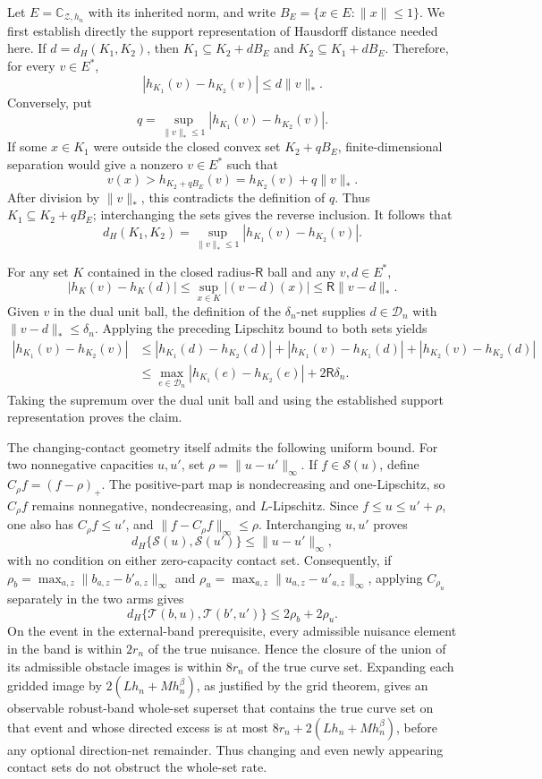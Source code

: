 Let \(E=\mathbb C_{\mathcal Z,h_n}\) with its inherited norm, and write
\(B_E=\{x\in E:\|x\|\le1\}\).  We first establish directly the support
representation of Hausdorff distance needed here.  If
\(d=d_H(K_1,K_2)\), then
\(K_1\subseteq K_2+dB_E\) and \(K_2\subseteq K_1+dB_E\).  Therefore, for
every \(v\in E^*\),
\[
 |h_{K_1}(v)-h_{K_2}(v)|\le d\|v\|_*.
\]
Conversely, put
\[
 q=\sup_{\|v\|_*\le1}|h_{K_1}(v)-h_{K_2}(v)|.
\]
If some \(x\in K_1\) were outside the closed convex set \(K_2+qB_E\),
finite-dimensional separation would give a nonzero \(v\in E^*\) such that
\[
 v(x)>h_{K_2+qB_E}(v)=h_{K_2}(v)+q\|v\|_*.
\]
After division by \(\|v\|_*\), this contradicts the definition of \(q\).
Thus \(K_1\subseteq K_2+qB_E\); interchanging the sets gives the reverse
inclusion.  It follows that
\[
 d_H(K_1,K_2)=
 \sup_{\|v\|_*\le1}|h_{K_1}(v)-h_{K_2}(v)|.
\]

For any set \(K\) contained in the closed radius-\(\mathsf R\) ball and any
\(v,d\in E^*\),
\[
 |h_K(v)-h_K(d)|
 \le\sup_{x\in K}|(v-d)(x)|
 \le\mathsf R\|v-d\|_*.
\]
Given \(v\) in the dual unit ball, the definition of the
\(\delta_n\)-net supplies \(d\in\mathcal D_n\) with
\(\|v-d\|_*\le\delta_n\).  Applying the preceding Lipschitz bound to both
sets yields
\[
\begin{aligned}
|h_{K_1}(v)-h_{K_2}(v)|
&\le |h_{K_1}(d)-h_{K_2}(d)|
   +|h_{K_1}(v)-h_{K_1}(d)|
   +|h_{K_2}(v)-h_{K_2}(d)|\\
&\le \max_{e\in\mathcal D_n}|h_{K_1}(e)-h_{K_2}(e)|
   +2\mathsf R\delta_n.
\end{aligned}
\]
Taking the supremum over the dual unit ball and using the established
support representation proves the claim.

The changing-contact geometry itself admits the following uniform bound.
For two nonnegative capacities \(u,u'\), set
\(\rho=\|u-u'\|_\infty\).  If \(f\in\mathcal S(u)\), define
\(C_\rho f=(f-\rho)_+\).  The positive-part map is nondecreasing and
one-Lipschitz, so \(C_\rho f\) remains nonnegative, nondecreasing, and
\(L\)-Lipschitz.  Since \(f\le u\le u'+\rho\), one also has
\(C_\rho f\le u'\), and
\(\|f-C_\rho f\|_\infty\le\rho\).  Interchanging \(u,u'\) proves
\[
 d_H\{\mathcal S(u),\mathcal S(u')\}\le\|u-u'\|_\infty,
\]
with no condition on either zero-capacity contact set.  Consequently, if
\(\rho_b=\max_{a,z}\|b_{a,z}-b'_{a,z}\|_\infty\) and
\(\rho_u=\max_{a,z}\|u_{a,z}-u'_{a,z}\|_\infty\), applying
\(C_{\rho_u}\) separately in the two arms gives
\[
 d_H\{\mathcal T(b,u),\mathcal T(b',u')\}
 \le2\rho_b+2\rho_u.
\]
On the event in the external-band prerequisite, every admissible nuisance
element in the band is within \(2r_n\) of the true nuisance.  Hence the
closure of the union of its admissible obstacle images is within
\(8r_n\) of the true curve set.  Expanding each gridded image by
\(2(Lh_n+Mh_n^\beta)\), as justified by the grid theorem, gives an observable
robust-band whole-set superset that contains the true curve set on that event
and whose directed excess is at most
\(8r_n+2(Lh_n+Mh_n^\beta)\), before any optional direction-net remainder.
Thus changing and even newly appearing contact sets do not obstruct the
whole-set rate.


